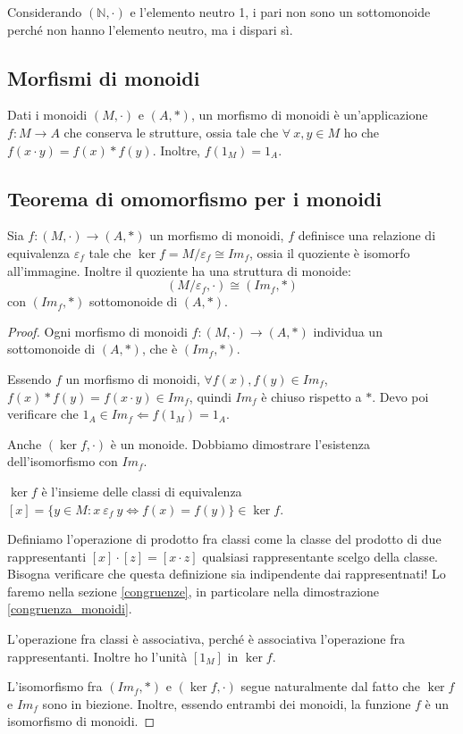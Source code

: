 Considerando $(\mathbb{N}, \cdot)$ e l'elemento neutro 1, i pari non sono un sottomonoide perch\'e non hanno l'elemento neutro, ma i dispari s\`i.

\subsection{Morfismi di monoidi}

\begin{defn}
Dati i monoidi $(M, \cdot)$ e $(A, \ast)$, un morfismo di monoidi \`e un'applicazione $f : M \to A$ che conserva le strutture, ossia tale che $\forall \ x,y \in M $ ho che $f(x \cdot y) = f(x) \ast f(y)$. Inoltre, $f(1_M) = 1_A$.
\end{defn}

\subsection{Teorema di omomorfismo per i monoidi\label{omomorfismo_monoidi}}

\begin{prop}
Sia $f : (M, \cdot) \to (A, \ast)$ un morfismo di monoidi, $f$ definisce una relazione di equivalenza $\varepsilon_f$ tale che $\ker f = M / \varepsilon_f \cong Im_f$, ossia il quoziente \`e isomorfo all'immagine. Inoltre il quoziente ha una struttura di monoide:
\[
(M / \varepsilon_f , \cdot) \cong (Im_f, \ast)
\]
con $(Im_f, \ast)$ sottomonoide di $(A, \ast)$.
\end{prop}
\begin{proof}
Ogni morfismo di monoidi $f : (M, \cdot) \to (A, \ast)$ individua un sottomonoide di $(A, \ast)$, che \`e $(Im_f, \ast)$. 

Essendo $f$ un morfismo di monoidi, $\forall f(x), f(y) \in Im_f$, $f(x) \ast f(y) = f(x \cdot y) \in Im_f$, quindi $Im_f $ \`e chiuso rispetto a $\ast$. Devo poi verificare che $1_A \in Im_f \Leftarrow f(1_M) = 1_A$.

Anche $(\ker f, \cdot)$ \`e un monoide. Dobbiamo dimostrare l'esistenza dell'isomorfismo con $Im_f$.

$\ker f$ \`e l'insieme delle classi di equivalenza $[x] = \{ y \in M : x \ \varepsilon_f \ y \Leftrightarrow f(x) = f(y) \} \in \ker f$.

Definiamo l'operazione di prodotto fra classi come la classe del prodotto di due rappresentanti $[x] \cdot [z] = [x \cdot z]$ qualsiasi rappresentante scelgo della classe. Bisogna verificare che questa definizione sia indipendente dai rappresentnati! Lo faremo nella sezione \ref{congruenze}, in particolare nella dimostrazione \ref{congruenza_monoidi}. 

L'operazione fra classi \`e associativa, perch\'e \`e associativa l'operazione fra rappresentanti. Inoltre ho l'unit\`a $[1_M]$ in $\ker f$.

L'isomorfismo fra $(Im_f, \ast)$ e $(\ker f, \cdot)$ segue naturalmente dal fatto che $\ker f $ e $Im_f$ sono in biezione. Inoltre, essendo entrambi dei monoidi, la funzione $f$ \`e un isomorfismo di monoidi.
\end{proof}

